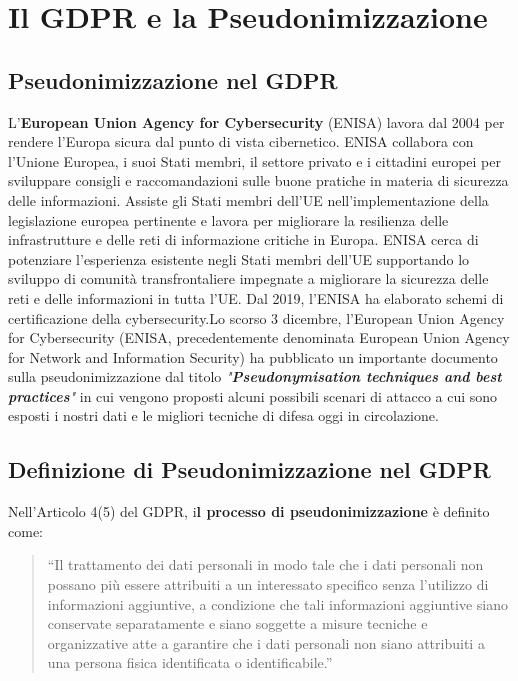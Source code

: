 \chapter{Il GDPR e la Pseudonimizzazione}


\section{Pseudonimizzazione nel GDPR}

L'\textbf{European Union Agency for Cybersecurity} (ENISA) lavora dal 2004 per rendere l'Europa sicura dal punto di vista cibernetico. ENISA collabora con l'Unione Europea, i suoi Stati membri, il settore privato e i cittadini europei per sviluppare consigli e raccomandazioni sulle buone pratiche in materia di sicurezza delle informazioni. Assiste gli Stati membri dell'UE nell'implementazione della legislazione europea pertinente e lavora per migliorare la resilienza delle infrastrutture e delle reti di informazione critiche in Europa. ENISA cerca di potenziare l'esperienza esistente negli Stati membri dell'UE supportando lo sviluppo di comunità transfrontaliere impegnate a migliorare la sicurezza delle reti e delle informazioni in tutta l'UE. Dal 2019, l'ENISA ha elaborato schemi di certificazione della cybersecurity.Lo scorso 3 dicembre, l'European Union Agency for Cybersecurity (ENISA, precedentemente denominata European Union Agency for Network and Information Security) ha pubblicato un importante documento sulla pseudonimizzazione dal titolo \textit{"\textbf{Pseudonymisation techniques and best practices}"} in cui vengono proposti alcuni possibili scenari di attacco a cui sono esposti i nostri dati e le migliori tecniche di difesa oggi in circolazione.

\newpage

\section{Definizione di Pseudonimizzazione nel GDPR}
Nell'Articolo 4(5) del GDPR, i\textbf{l processo di pseudonimizzazione} è definito come:
\begin{quote}
“Il trattamento dei dati personali in modo tale che i dati personali non possano più essere attribuiti a un interessato specifico senza l'utilizzo di informazioni aggiuntive, a condizione che tali informazioni aggiuntive siano conservate separatamente e siano soggette a misure tecniche e organizzative atte a garantire che i dati personali non siano attribuiti a una persona fisica identificata o identificabile.”
\end{quote}

